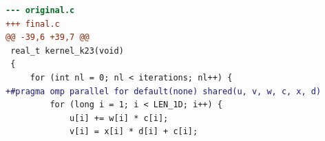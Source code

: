 \begin{lstlisting}[language=diff,basicstyle=\ttfamily\scriptsize,breaklines=true,caption={tsvc_c2/k23 — BROKEN (e2v6_bare_fable)}]
--- original.c
+++ final.c
@@ -39,6 +39,7 @@
 real_t kernel_k23(void)
 {
     for (int nl = 0; nl < iterations; nl++) {
+#pragma omp parallel for default(none) shared(u, v, w, c, x, d)
         for (long i = 1; i < LEN_1D; i++) {
             u[i] += w[i] * c[i];
             v[i] = x[i] * d[i] + c[i];
\end{lstlisting}
